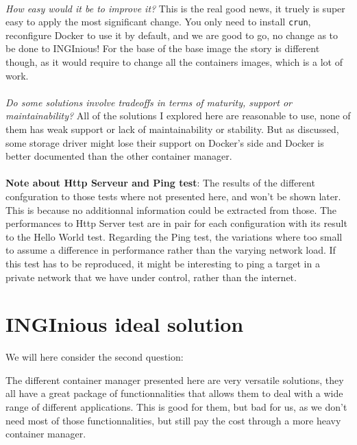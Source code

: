 \paragraph{}\textit{How easy would it be to improve it?}  This is the real good news, it truely is super easy to apply the most significant change.  You only need to install \texttt{crun}, reconfigure Docker to use it by default, and we are good to go, no change as to be done to INGInious!  For the base of the base image the story is different though, as it would require to change all the containers images, which is a lot of work.
\paragraph{}\textit{Do some solutions involve tradeoffs in terms of maturity, support or maintainability?}  All of the solutions I explored here are reasonable to use, none of them has weak support or lack of maintainability or stability.  But as discussed, some storage driver might lose their support on Docker's side and Docker is better documented than the other container manager.

\paragraph{}\textbf{Note about Http Serveur and Ping test}:  The results of the different confguration to those tests where not presented here, and won't be shown later.  This is because no additionnal information could be extracted from those.  The performances to Http Server test are in pair for each configuration with its result to the Hello World test.  Regarding the Ping test, the variations where too small to assume a difference in performance rather than the varying network load.  If this test has to be reproduced, it might be interesting to ping a target in a private network that we have under control, rather than the internet.

\section{INGInious ideal solution}
We will here consider the second question:
\begin{center}
\end{center}

The different container manager presented here are very versatile solutions, they all have a great package of functionnalities that allows them to deal with a wide range of different applications.  This is good for them, but bad for us, as we don't need most of those functionnalities, but still pay the cost through a more heavy container manager.

